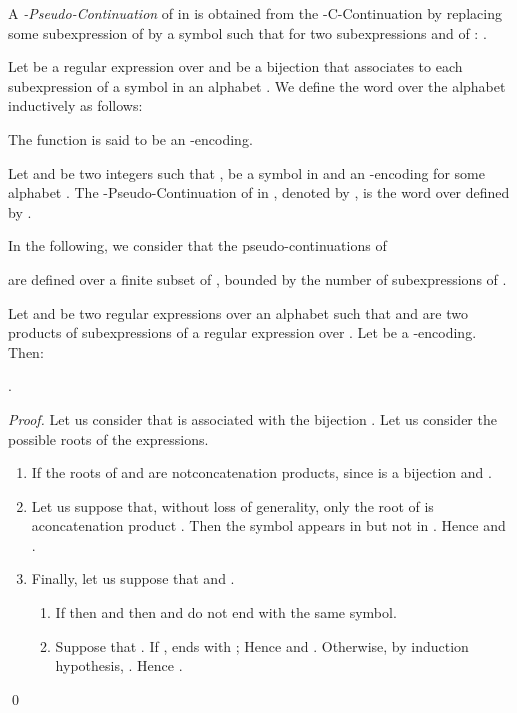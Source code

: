 \documentclass{llncs}
\begin{document}
\noindent  A \emph{-Pseudo-Continuation}  of  in  is obtained from the 
 -C-Continuation  by replacing some subexpression  of  by a symbol  such that for two subexpressions 
  and  of :   
.


\begin{definition}\label{def2}
Let  be a regular expression over  and  be a bijection that associates to each subexpression of  a symbol in an alphabet . We define the word  over the alphabet  inductively as follows:
   
 \centerline{}
      
  \noindent The function  is said to be an -encoding.
\end{definition}

\begin{definition}
Let  and  be two integers such that ,  be a symbol in   and  an -encoding for some alphabet . The -Pseudo-Continuation of  in , denoted by , is the word over  defined by .
\end{definition}

In the following, we consider that the pseudo-continuations of 

are defined over  a finite subset of , bounded by the number of subexpressions of .

\begin{lemma}\label{lem egal psi egal exp}
  Let  and  be two regular expressions over an alphabet  such that  and  are two products of subexpressions of a regular expression  over . Let  be a -encoding. Then:
  
  \centerline{
      .
  }
\end{lemma}
\begin{proof}
  Let us consider that  is associated with the bijection . Let us consider the possible roots of the expressions.
  \begin{enumerate}
    \item If the roots of  and  are notconcatenation products,    since  is a bijection and .
  
    \item Let us suppose that, without loss of generality, only the root of  is aconcatenation product . Then the symbol  appears in  but not in . Hence  and .
  
    \item Finally, let us suppose that  and . 
    \begin{enumerate}
      \item If  then  and then  and  do not end with the same symbol.
      \item Suppose that . If ,  ends with  ; Hence  and . Otherwise, by induction hypothesis,   . Hence   .
    \end{enumerate}
  \end{enumerate}
  \qed
\end{proof}
\end{document}
